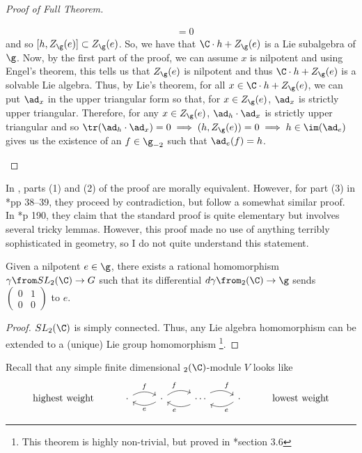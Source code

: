 \begin{proof}[Proof of Full Theorem]
\begin{enumerate}[label=(\arabic*)]
\begin{align*}
                & = 0
    \end{align*}
    and so \([h,Z_\g(e)] \subset Z_\g(e)\). So, we have that \(\C
    \cdot h + Z_\g(e)\) is a Lie subalgebra of \(\g\). Now, by the
    first part of the proof, we can assume \(x\) is nilpotent and
    using Engel's theorem, this tells us that \(Z_\g(e)\) is
    nilpotent and thus \(\C \cdot h + Z_\g(e)\) is a solvable Lie
    algebra. Thus, by Lie's theorem, for all \(x \in \C \cdot h +
    Z_\g(e)\), we can put \(\ad_x\) in the upper triangular form so
    that, for \(x \in Z_\g(e)\), \(\ad_x\) is strictly upper
    triangular. Therefore, for any \(x \in Z_\g(e)\), \(\ad_h \cdot
    \ad_x\) is strictly upper triangular and so \(\tr(\ad_h \cdot
    \ad_x) = 0 \implies (h,Z_\g(e)) = 0 \implies h \in \im(\ad_e)\)
    gives us the existence of an \(f \in \g_{-2}\) such that
    \(\ad_e(f) = h\). 
  \end{enumerate}
\end{proof}
\begin{rmk}
  In \cite{cm}, parts (1) and (2) of the proof are morally
  equivalent. However, for part (3) in \cite{cm}*{pp 38--39}, they proceed by
  contradiction, but follow a somewhat similar proof. In \cite{cg}*{p
    190}, they claim that the standard proof is quite elementary but
  involves several tricky lemmas. However, this proof made no use of
  anything terribly sophisticated in geometry, so I do not quite
  understand this statement.
\end{rmk}
\begin{cor}
  Given a nilpotent \(e \in \g\), there exists a rational homomorphism
  \(\gamma \from SL_2(\C) \to G\) such that its differential \(d\gamma
  \from \sl_2(\C) \to \g\) sends \(\left(
    \begin{array}{cc}
      0&1\\
      0&0
    \end{array}
\right)\) to \(e\).
\end{cor}
\begin{proof}
  \(SL_2(\C)\) is simply connected. Thus, any Lie algebra homomorphism
  can be extended to a (unique) Lie group homomorphism \footnote{This
    theorem is highly non-trivial, but proved in \cite{hall}*{section 3.6}}.
\end{proof}
Recall that any simple finite dimensional \(\sl_2(\C)\)-module \(V\)
looks like \[
  \begin{tikzcd}
    \text{highest weight} & \cdot \ar[r, bend left, "f"] & \ar[l, bend
    left, "e"] \cdot \ar[r, bend left, "f"] & \ar[l, bend
    left, "e"] \cdots  \ar[r, bend left, "f"] & \ar[l, bend
    left, "e"] \cdot & \text{lowest weight}
  \end{tikzcd}
\]
